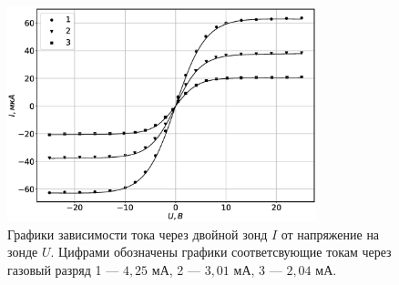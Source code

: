 \documentclass[12pt]{article}
\begin{document}
\begin{figure}[H]
	\centering
	\includegraphics[width=0.8\textwidth]{UI_main.eps}
	\caption{Графики зависимости тока через двойной зонд $I$ от напряжение на зонде $U$.
		Цифрами обозначены графики соответсвующие токам через газовый разряд 1 --- $4,25$ мА,
		2 --- $3,01$ мА, 3 --- $2,04$ мА.}
	\label{fig:UI}
\end{figure}
\end{document}
